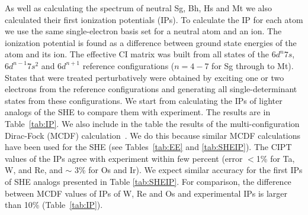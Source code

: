 \documentclass[10pt,a4paper, twoside, openright]{report}
\begin{document}
As well as calculating the spectrum of neutral Sg, Bh, Hs and Mt we also calculated their first ionization potentials (IPs). To calculate the IP for each atom we use the same single-electron basis set for a neutral atom and an ion. The ionization potential is found as a difference between ground state energies of the atom and its ion. The effective CI matrix was built from all states of the $6d^n 7s$, $6d^{n-1}7s^2$ and $6d^{n+1}$ reference configurations ($n=4-7$ for Sg through to Mt). States that were treated perturbatively were obtained by exciting one or two electrons from the reference configurations and generating all single-determinant states from these configurations. We start from calculating the IPs of lighter analogs of the SHE to compare them with experiment. The results are in Table~\ref{tab:IP}. We also include in the table the results of the multi-configuration Dirac-Fock (MCDF) calculation~\cite{MCDF-Sg,MCDF-BhHs}. We do this because similar MCDF calculations have been used for the SHE (see Tables~\ref{tab:EE} and \ref{tab:SHEIP}). The CIPT values of the IPs agree with experiment within few percent (error $<$1\% for Ta, W, and Re, and $\sim$ 3\% for Os and Ir). We expect similar accuracy for the first IPs of SHE analogs presented in Table \ref{tab:SHEIP}.  For comparison, the difference between MCDF values of IPs of W, Re and Os and experimental IPs is larger than 10\% (Table~\ref{tab:IP}).
\end{document}
